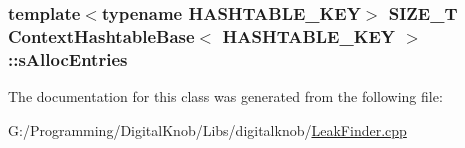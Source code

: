 \hypertarget{class_context_hashtable_base_acf5c9250de4fab9142480d651f0cd421}{
\subsubsection[{s\-Alloc\-Entries}]{\setlength{\rightskip}{0pt plus 5cm}template$<$typename H\-A\-S\-H\-T\-A\-B\-L\-E\-\_\-\-K\-E\-Y$>$ {\bf S\-I\-Z\-E\-\_\-\-T} {\bf Context\-Hashtable\-Base}$<$ H\-A\-S\-H\-T\-A\-B\-L\-E\-\_\-\-K\-E\-Y $>$\-::s\-Alloc\-Entries}}\label{class_context_hashtable_base_acf5c9250de4fab9142480d651f0cd421}


The documentation for this class was generated from the following file\-:\begin{DoxyCompactItemize}
\item 
G\-:/\-Programming/\-Digital\-Knob/\-Libs/digitalknob/\hyperlink{_leak_finder_8cpp}{Leak\-Finder.\-cpp}\end{DoxyCompactItemize}
